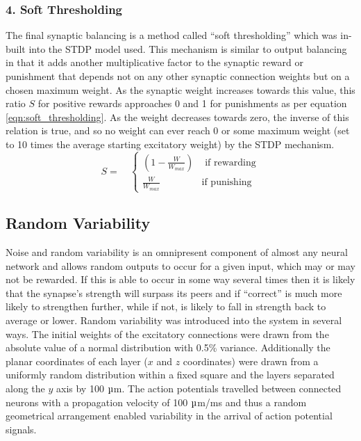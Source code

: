 \documentclass[11pt, twocolumn]{article}
\begin{document}
\subsubsection*{4. Soft Thresholding}
The final synaptic balancing is a method called ``soft thresholding'' which was in-built into the \acs{STDP} model used. This mechanism is similar to output balancing in that it adds another multiplicative factor to the synaptic reward or punishment that depends not on any other synaptic connection weights but on a chosen maximum weight. As the synaptic weight increases towards this value, this ratio $S$ for positive rewards approaches 0 and 1 for punishments as per equation \ref{eqn:soft_thresholding}. As the weight decreases towards zero, the inverse of this relation is true, and so no weight can ever reach 0 or some maximum weight (set to 10 times the average starting excitatory weight) by the \acs{STDP} mechanism.
\begin{equation}
	S = \quad
	\begin{cases} 
	\left(1-\frac{W}{W_{max}}\right) & \text{ if rewarding} \\
	\frac{W}{W_{max}} & \text{if punishing}
	\end{cases}
	\label{eqn:soft_thresholding}
\end{equation}


\subsection*{Random Variability}
Noise and random variability is an omnipresent component of almost any neural network and allows random outputs to occur for a given input, which may or may not be rewarded. If this is able to occur in some way several times then it is likely that the synapse's strength will surpass its peers and if ``correct'' is much more likely to strengthen further, while if not, is likely to fall in strength back to average or lower. Random variability was introduced into the system in several ways. The initial weights of the excitatory connections were drawn from the absolute value of a normal distribution with 0.5\% variance. Additionally the planar coordinates of each layer ($x$ and $z$ coordinates) were drawn from a uniformly random distribution within a fixed square and the layers separated along the $y$ axis by 100 $\micro$m. The action potentials travelled between connected neurons with a propagation velocity of 100 $\micro$m/ms and thus a random geometrical arrangement enabled variability in the arrival of action potential signals.
\end{document}
